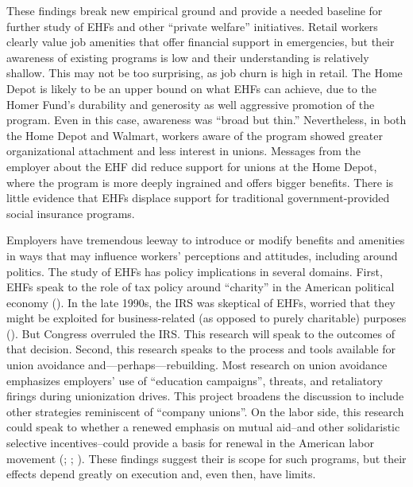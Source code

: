 \documentclass[
  11pt,
  oneside]{article}
\begin{document}
These findings break new empirical ground and provide a needed baseline for further study of EHFs and other ``private welfare'' initiatives. Retail workers clearly value job amenities that offer financial support in emergencies, but their awareness of existing programs is low and their understanding is relatively shallow. This may not be too surprising, as job churn is high in retail. The Home Depot is likely to be an upper bound on what EHFs can achieve, due to the Homer Fund's durability and generosity as well aggressive promotion of the program. Even in this case, awareness was ``broad but thin.'' Nevertheless, in both the Home Depot and Walmart, workers aware of the program showed greater organizational attachment and less interest in unions. Messages from the employer about the EHF did reduce support for unions at the Home Depot, where the program is more deeply ingrained and offers bigger benefits. There is little evidence that EHFs displace support for traditional government-provided social insurance programs.

Employers have tremendous leeway to introduce or modify benefits and amenities in ways that may influence workers' perceptions and attitudes, including around politics. The study of EHFs has policy implications in several domains. First, EHFs speak to the role of tax policy around ``charity'' in the American political economy (). In the late 1990s, the IRS was skeptical of EHFs, worried that they might be exploited for business-related (as opposed to purely charitable) purposes (). But Congress overruled the IRS. This research will speak to the outcomes of that decision. Second, this research speaks to the process and tools available for union avoidance and---perhaps---rebuilding. Most research on union avoidance emphasizes employers' use of ``education campaigns'', threats, and retaliatory firings during unionization drives. This project broadens the discussion to include other strategies reminiscent of ``company unions''. On the labor side, this research could speak to whether a renewed emphasis on mutual aid--and other solidaristic selective incentives--could provide a basis for renewal in the American labor movement (; ; ). These findings suggest their is scope for such programs, but their effects depend greatly on execution and, even then, have limits.
\end{document}
